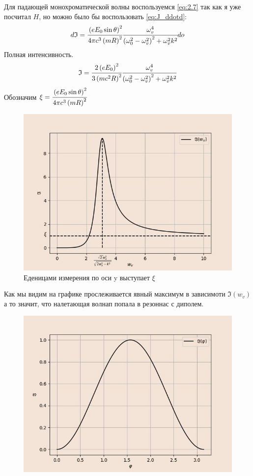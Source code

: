 Для падающей монохроматической волны воспользуемся  \ref{eq:2.7} так как я уже посчитал 
$H$, но можно было бы воспользовать \ref{eq:J_ddotd}:
\begin{equation}
    d\mathfrak{I} =  \cfrac{\left( eE_0 \sin \theta \right)^2}{4\pi c^3 \left( mR \right)^2} 
    \cfrac{\omega_v^4}{\left( \omega_0^2 - \omega_v^2  \right)^2 + \omega_v^2 k^2 } do
\end{equation}
Полная интенсивность.
\begin{equation}
    \mathfrak{I} =  \cfrac{2\left( eE_0 \right)^2}{3 \left( mc^2R \right)^2} 
    \cfrac{\omega_v^4}{\left( \omega_0^2 - \omega_v^2  \right)^2 + \omega_v^2 k^2 }
\end{equation}
Обозначим $\xi = \cfrac{\left( eE_0 \sin \theta \right)^2}{4\pi c^3 \left( mR \right)^2}$
\begin{figure}[H]
    \centering
    \includegraphics[width=1\textwidth]{sours_img/omega.jpg}
    \caption{Еденицами измерения по оси y выступает $\xi$}
    \label{pict:j_w}
\end{figure}

Как мы видим на графике прослеживается явный максимум в зависимоти $\mathfrak{I}(w_v)$ 
а то значит, что налетающая волнап попала в резоннас с диполем. 

\begin{figure}[H]
    \centering
    \includegraphics[trim={0 0 0 0},clip,width=1\textwidth]{sours_img/phi.jpg}
    
    \label{pict:J_phi}
\end{figure}


